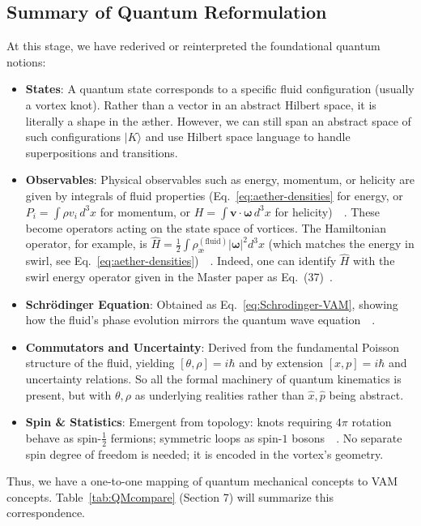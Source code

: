 \documentclass[preprint]{revtex4-2}
\begin{document}
    \subsection{Summary of Quantum Reformulation}
    At this stage, we have rederived or reinterpreted the foundational quantum notions:
    \begin{itemize}
        \item \textbf{States}: A quantum state corresponds to a specific fluid configuration (usually a vortex knot). Rather than a vector in an abstract Hilbert space, it is literally a shape in the æther. However, we can still span an abstract space of such configurations $|K\rangle$ and use Hilbert space language to handle superpositions and transitions.
        \item \textbf{Observables}: Physical observables such as energy, momentum, or helicity are given by integrals of fluid properties (Eq.~\ref{eq:aether-densities} for energy, or $P_i = \int \rho v_i\,d^3x$ for momentum, or $H=\int \mathbf{v}\cdot\boldsymbol{\omega}\,d^3x$ for helicity)~\cite{reference_85}~\cite{reference_86}. These become operators acting on the state space of vortices. The Hamiltonian operator, for example, is $\hat{H} = \frac{1}{2}\int \rho_{\text{\ae}}^{(\text{fluid})} |\boldsymbol{\omega}|^2 d^3x$ (which matches the energy in swirl, see Eq.~\ref{eq:aether-densities})~\cite{reference_87}~\cite{reference_88}. Indeed, one can identify $\hat{H}$ with the swirl energy operator given in the Master paper as Eq.~(37)~\cite{reference_89}.
        \item \textbf{Schrödinger Equation}: Obtained as Eq.~\eqref{eq:Schrodinger-VAM}, showing how the fluid’s phase evolution mirrors the quantum wave equation~\cite{reference_90}~\cite{reference_91}.
        \item \textbf{Commutators and Uncertainty}: Derived from the fundamental Poisson structure of the fluid, yielding $[\theta, \rho] = i\hbar$ and by extension $[x,p]=i\hbar$ and uncertainty relations. So all the formal machinery of quantum kinematics is present, but with $\theta,\rho$ as underlying realities rather than $\hat{x},\hat{p}$ being abstract.
        \item \textbf{Spin \& Statistics}: Emergent from topology: knots requiring $4\pi$ rotation behave as spin-$\frac{1}{2}$ fermions; symmetric loops as spin-$1$ bosons~\cite{reference_92}~\cite{reference_93}. No separate spin degree of freedom is needed; it is encoded in the vortex's geometry.
    \end{itemize}
    Thus, we have a one-to-one mapping of quantum mechanical concepts to VAM concepts. Table~\ref{tab:QMcompare} (Section 7) will summarize this correspondence.
\end{document}
